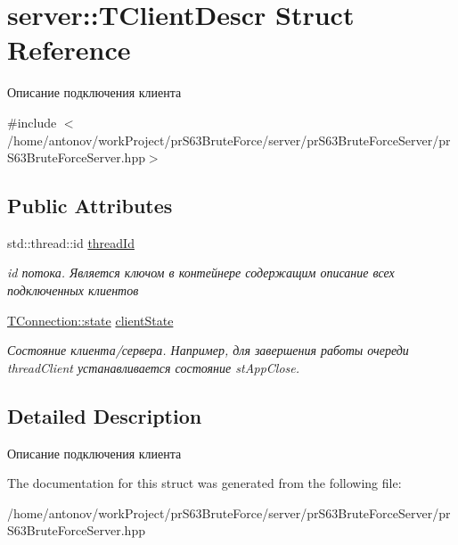 \hypertarget{structserver_1_1_t_client_descr}{}\section{server\+:\+:T\+Client\+Descr Struct Reference}
\label{structserver_1_1_t_client_descr}


Описание подключения клиента  




{\ttfamily \#include $<$/home/antonov/work\+Project/pr\+S63\+Brute\+Force/server/pr\+S63\+Brute\+Force\+Server/pr\+S63\+Brute\+Force\+Server.\+hpp$>$}

\subsection*{Public Attributes}
\begin{DoxyCompactItemize}
\item 
\mbox{\label{structserver_1_1_t_client_descr_a7b1577caf2feeab04923197011b3d47a}} 
std\+::thread\+::id \hyperlink{structserver_1_1_t_client_descr_a7b1577caf2feeab04923197011b3d47a}{thread\+Id}
\begin{DoxyCompactList}\small\item\em id потока. Является ключом в контейнере содержащим описание всех подключенных клиентов \end{DoxyCompactList}\item 
\mbox{\label{structserver_1_1_t_client_descr_afbbb3da9139c4c9547908252cd9c1d34}} 
\hyperlink{classconnection_1_1_t_connection_aee7dfb7510592bd2697ab6f906b9612c}{T\+Connection\+::state} \hyperlink{structserver_1_1_t_client_descr_afbbb3da9139c4c9547908252cd9c1d34}{client\+State}
\begin{DoxyCompactList}\small\item\em Состояние клиента/сервера. Например, для завершения работы очереди thread\+Client устанавливается состояние st\+App\+Close. \end{DoxyCompactList}\end{DoxyCompactItemize}


\subsection{Detailed Description}
Описание подключения клиента 

The documentation for this struct was generated from the following file\+:\begin{DoxyCompactItemize}
\item 
/home/antonov/work\+Project/pr\+S63\+Brute\+Force/server/pr\+S63\+Brute\+Force\+Server/pr\+S63\+Brute\+Force\+Server.\+hpp\end{DoxyCompactItemize}
